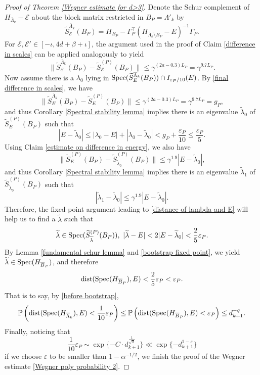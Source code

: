\documentclass[11pt,reqno,UTF8,twoside]{amsart}
\newcommand{\spec}{{\rm Spec}}
\newcommand{\barLambda}{\overline{\Lambda}}
\renewcommand{\P}{\mathbb{P}}
\newcommand{\mcE}{\mathcal{E}}
\newcommand{\wtlambda}{\widetilde{\lambda}}
\newcommand{\barB}{\overline{B}}
\newcommand{\dist}{{\rm dist}}
\theoremstyle{definition}
\numberwithin{equation}{section}
\begin{document}
\begin{proof}[Proof of Theorem \ref{Wegner estimate for d>3}]
Denote the Schur complement of $H_{\barLambda_k}-\mcE$ about the block matrix restricted in $B_P=\Lambda'_k$ by 
\[\widetilde{S}^{\barLambda_k}_\mcE (B_P)= H_{B_P}-\Gamma_P^{\top} (H_{\barLambda_k \setminus B_P}-E)^{-1}\Gamma_P . \]
For $\mcE,\mcE'\in [-\iota,4d+\beta+\iota]$, the argument used in the proof of Claim \ref{difference in scales} can be applied analogously to  yield 
\begin{equation}\label{final difference in scales}
  \| \widetilde{S}^{\barLambda_k}_\mcE (B_P) - \widetilde{S}^{(P)}_\mcE (B_P) \| \leq \gamma^{(2a-0.3)L_P}=\gamma^{9.7L_P}.
\end{equation}
Now assume there is a $\lambda_0$ lying in $\spec(\widetilde{S}^{\barLambda_k}_E (B_P) )\cap I_{\varepsilon_P/10 }(E)$. By \eqref{final difference in scales},  we have 
\[   \| \widetilde{S}^{\barLambda_k}_E (B_P) - \widetilde{S}^{(P)}_E (B_P) \| \leq \gamma^{(2a-0.3)L_P}=\gamma^{9.7L_P}=g_P, \]
and thus Corollary \ref{Spectral stability lemma} implies there is an eigenvalue $\wtlambda_0$ of $\widetilde{S}^{(P)}_E (B_P)$ such that 
\[|E-\wtlambda_0|\leq |\lambda_0-E|+|\lambda_0-\wtlambda_0|< g_P +\frac{\varepsilon_P}{10}\leq \frac{\varepsilon_P}{5}. \]
Using Claim \ref{estimate on difference in energy}, we also have 
\[  \|  \widetilde{S}^{(P)}_E (B_P) -\widetilde{S}^{(P)}_{\wtlambda_0} (B_P)\| \leq \gamma^{1.9} |E-\wtlambda_0|,\]
and thus Corollary \ref{Spectral stability lemma} implies there is an eigenvalue $\wtlambda_1$ of $\widetilde{S}^{(P)}_{\wtlambda_0} (B_P)$ such that 
\[|\wtlambda_1-\wtlambda_0|\leq\gamma^{1.9 } |E-\wtlambda_0|. \]
Therefore, the fixed-point argument   leading to \eqref{distance of lambda and E} will help us to find a $\wtlambda$ such that 
\begin{equation}\label{bootstrap fixed point}
  \wtlambda\in \spec(\widetilde{S}^{(P)}_{\wtlambda} (B_P) ),\ |\wtlambda-E|<2|E-\wtlambda_0|<\frac{2}{5}\varepsilon_P.
\end{equation}
By Lemma \ref{fundamental schur lemma} and \eqref{bootstrap fixed point}, we  yield $\wtlambda\in \spec(H_{\barB_P})$, and therefore 
\[ \dist(\spec(H_{\barB_P}) , E) <\frac{2}{5}\varepsilon_P<\varepsilon_P .\]
That is to say, by \eqref{before bootstrap}, 
\begin{align}\label{after bootstrap}
 \P\left(\dist(\spec(H_{\barLambda_k}) , E) <\frac{1}{10}\varepsilon_P\right) \leq  \P\left(\dist(\spec(H_{\barB_P}) , E) <\varepsilon_P \right) \leq d_{k+1}^{-q}.
\end{align}
Finally, noticing that 
 \[ \frac{1}{10}\varepsilon_P \sim \exp\{-C\cdot d_{k+1}^{\frac{1}{\sqrt{\alpha}}} \} \ll \exp\{-d_{k+1}^{1-\varepsilon}\} \]
if we choose $\varepsilon$ to be smaller than $1-\alpha^{-1/2}$, we finish the proof of the Wegner estimate \eqref{Wegner poly probability 2}.


\end{proof}
\end{document}
